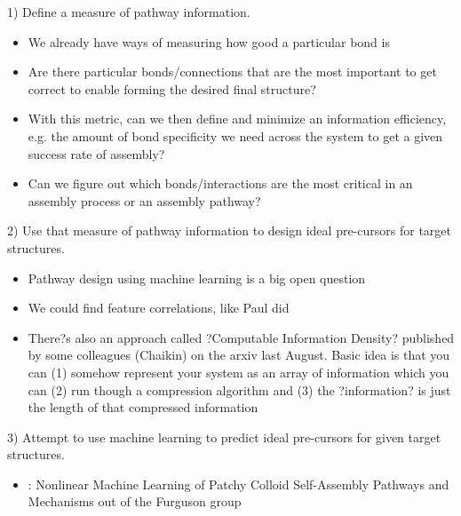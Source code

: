 1) Define a measure of pathway information.
\begin{itemize}
\item We already have ways of measuring how good a particular bond is
\item Are there particular bonds/connections that are the most important to get correct to enable forming the desired final structure?
\item With this metric, can we then define and minimize an information efficiency, e.g. the amount of bond specificity we need across the system to get a given success rate of assembly?
\item Can we figure out which bonds/interactions are the most critical in an assembly process or an assembly pathway?
\end{itemize}


2) Use that measure of pathway information to design ideal pre-cursors for target structures.
\begin{itemize}
\item Pathway design using machine learning is a big open question
\item We could find feature correlations, like Paul did
\item There?s also an approach called ?Computable Information Density? published by some colleagues (Chaikin) on the arxiv last August. Basic idea is that you can (1) somehow represent your system as an array of information which you can (2) run though a compression algorithm and (3) the ?information? is just the length of that compressed information
\end{itemize}


3) Attempt to use machine learning to predict ideal pre-cursors for given target structures. \\
\begin{itemize}
\item \cite{Long_2014_JPhysChemB}: Nonlinear Machine Learning of Patchy Colloid Self-Assembly Pathways and Mechanisms out of the Furguson group
\end{itemize}

